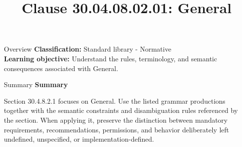 \documentclass[10pt,letterpaper]{article}
\title{Clause 30.04.08.02.01: General}
\author{}
\date{}
\begin{document}
\maketitle
\begin{CornellOverviewBox}{Overview}
\textbf{Classification:} Standard library - Normative\\[2pt]
\textbf{Learning objective:} Understand the rules, terminology, and semantic consequences associated with General.
\end{CornellOverviewBox}\begin{CornellSummaryBox}{Summary}
{\sffamily\bfseries\color{Accent} Summary}\par\vspace{3pt}Section 30.4.8.2.1 focuses on General. Use the listed grammar productions together with the semantic constraints and disambiguation rules referenced by the section. When applying it, preserve the distinction between mandatory requirements, recommendations, permissions, and behavior deliberately left undefined, unspecified, or implementation-defined.
\end{CornellSummaryBox}
\end{document}
